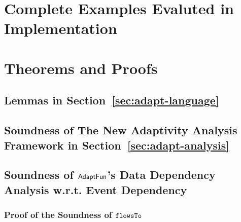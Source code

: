 \section{Complete Examples Evaluted in Implementation}
\label{appendix:implementation}


\section{Theorems and Proofs}
\label{appendix:thm-adaptivity}
\subsection{Lemmas in Section~\ref{sec:adapt-language}}
\label{apdx:lemma_sec123}

\clearpage
\subsection{Soundness of The New Adaptivity Analysis Framework in Section~\ref{sec:adapt-analysis}}
\label{apdx:adapt_soundness}


\clearpage



\clearpage

\subsection{Soundness of $\textsf{AdaptFun}$'s Data Dependency Analysis w.r.t. Event Dependency}
\subsubsection{Proof of the Soundness of $\mathtt{flowsTo}$}
\label{apdx:flowsto_soundness}

\clearpage
